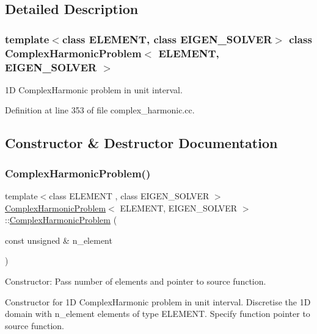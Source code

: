 \subsection{Detailed Description}
\subsubsection*{template$<$class E\+L\+E\+M\+E\+NT, class E\+I\+G\+E\+N\+\_\+\+S\+O\+L\+V\+ER$>$\newline
class Complex\+Harmonic\+Problem$<$ E\+L\+E\+M\+E\+N\+T, E\+I\+G\+E\+N\+\_\+\+S\+O\+L\+V\+E\+R $>$}

1D Complex\+Harmonic problem in unit interval. 

Definition at line 353 of file complex\+\_\+harmonic.\+cc.



\subsection{Constructor \& Destructor Documentation}
\mbox{\label{classComplexHarmonicProblem_aaec243aef8d954804e203f5d310b0800}} 
\subsubsection{\texorpdfstring{Complex\+Harmonic\+Problem()}{ComplexHarmonicProblem()}}
{\footnotesize\ttfamily template$<$class E\+L\+E\+M\+E\+NT , class E\+I\+G\+E\+N\+\_\+\+S\+O\+L\+V\+ER $>$ \\
\hyperlink{classComplexHarmonicProblem}{Complex\+Harmonic\+Problem}$<$ E\+L\+E\+M\+E\+NT, E\+I\+G\+E\+N\+\_\+\+S\+O\+L\+V\+ER $>$\+::\hyperlink{classComplexHarmonicProblem}{Complex\+Harmonic\+Problem} (\begin{DoxyParamCaption}\item[{const unsigned \&}]{n\+\_\+element }\end{DoxyParamCaption})}



Constructor\+: Pass number of elements and pointer to source function. 

Constructor for 1D Complex\+Harmonic problem in unit interval. Discretise the 1D domain with n\+\_\+element elements of type E\+L\+E\+M\+E\+NT. Specify function pointer to source function. 

